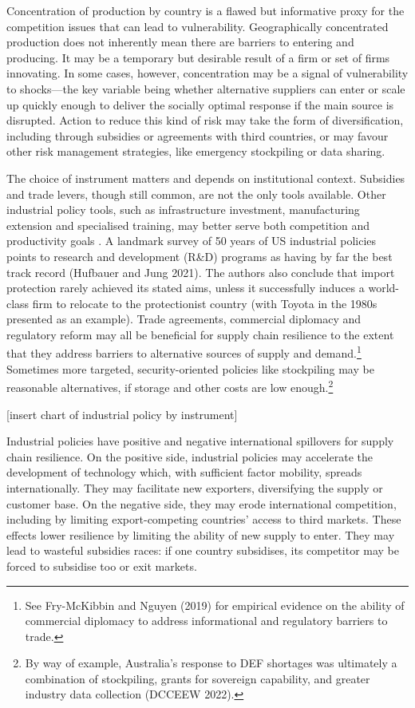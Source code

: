 \documentclass{article}
\begin{document}
Concentration of production by country is a flawed but informative proxy for the competition issues that can lead to vulnerability. Geographically concentrated production does not inherently mean there are barriers to entering and producing. It may be a temporary but desirable result of a firm or set of firms innovating. In some cases, however, concentration may be a signal of vulnerability to shocks---the key variable being whether alternative suppliers can enter or scale up quickly enough to deliver the socially optimal response if the main source is disrupted. Action to reduce this kind of risk may take the form of diversification, including through subsidies or agreements with third countries, or may favour other risk management strategies, like emergency stockpiling or data sharing.

The choice of instrument matters and depends on institutional context. Subsidies and trade levers, though still common, are not the only tools available. Other industrial policy tools, such as infrastructure investment, manufacturing extension and specialised training, may better serve both competition and productivity goals \parencite{juhasz_new_2023}. A landmark survey of 50 years of US industrial policies points to research and development (R\&D) programs as having by far the best track record (Hufbauer and Jung 2021). The authors also conclude that import protection rarely achieved its stated aims, unless it successfully induces a world-class firm to relocate to the protectionist country (with Toyota in the 1980s presented as an example). Trade agreements, commercial diplomacy and regulatory reform may all be beneficial for supply chain resilience to the extent that they address barriers to alternative sources of supply and demand.\footnote{See Fry-McKibbin and Nguyen (2019) for empirical evidence on the ability of commercial diplomacy to address informational and regulatory barriers to trade.} Sometimes more targeted, security-oriented policies like stockpiling may be reasonable alternatives, if storage and other costs are low enough.\footnote{By way of example, Australia's response to DEF shortages was ultimately a combination of stockpiling, grants for sovereign capability, and greater industry data collection (DCCEEW 2022).}

[insert chart of industrial policy by instrument]

Industrial policies have positive and negative international spillovers for supply chain resilience. On the positive side, industrial policies may accelerate the development of technology which, with sufficient factor mobility, spreads internationally. They may facilitate new exporters, diversifying the supply or customer base. On the negative side, they may erode international competition, including by limiting export-competing countries’ access to third markets. These effects lower resilience by limiting the ability of new supply to enter. They may lead to wasteful subsidies races: if one country subsidises, its competitor may be forced to subsidise too or exit markets.
\end{document}
